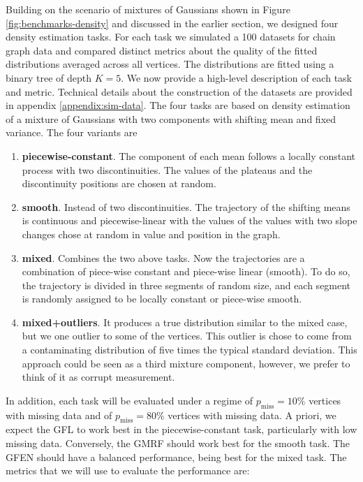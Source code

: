 \documentclass[a4paper, 11pt]{article}
\begin{document}
Building on the scenario of mixtures of Gaussians shown in Figure \ref{fig:benchmarks-density} and discussed in the earlier section, we designed four density estimation tasks. For each task we simulated a 100 datasets for chain graph data and compared distinct metrics about the quality of the fitted distributions averaged across all vertices. The distributions are fitted using a binary tree of depth $K=5$. We now provide a high-level description of each task and metric. Technical details about the construction of the datasets are provided in appendix \ref{appendix:sim-data}. The four tasks are based on density estimation of a mixture of Gaussians with two components with shifting mean and fixed variance. The four variants are
\begin{enumerate}[itemsep=0pt, partopsep=0pt]
    \item \textbf{piecewise-constant}. The component of each mean follows a locally constant process with two discontinuities. The values of the plateaus and the discontinuity positions are chosen at random.
    \item \textbf{smooth}. Instead of two discontinuities. The trajectory of the shifting means is continuous and piecewise-linear with the values of the values with two slope changes chose at random in value and position in the graph.
    \item \textbf{mixed}. Combines the two above tasks. Now the trajectories are a combination of piece-wise constant and piece-wise linear (smooth). To do so, the trajectory is divided in three segments of random size, and each segment is randomly assigned to be locally constant or piece-wise smooth.
    \item \textbf{mixed+outliers}. It produces a true distribution similar to the mixed case, but we one outlier to some of the vertices. This outlier is chose to come from a contaminating distribution of five times the typical standard deviation. This approach could be seen as a third mixture component, however, we prefer to think of it as corrupt measurement.
\end{enumerate}
In addition, each task will be evaluated under a regime of $p_\text{miss}=10\%$ vertices with missing data and of $p_\text{miss}=80\%$ vertices with missing data. A priori, we expect the GFL to work best in the piecewise-constant task, particularly with low missing data. Conversely, the GMRF should work best for the smooth task. The GFEN should have a balanced performance, being best for the mixed task. The metrics that we will use to evaluate the performance are:
\end{document}
